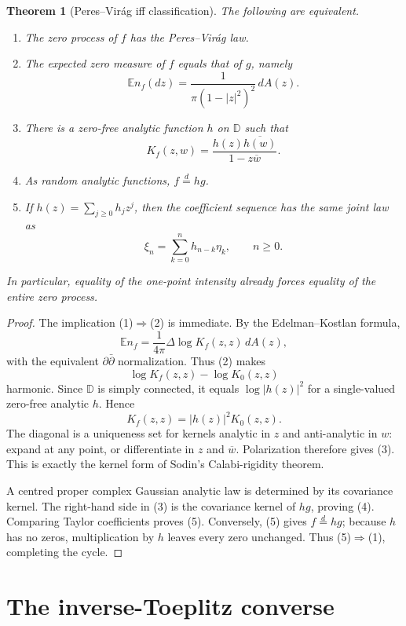 \documentclass[11pt]{article}
\newtheorem{theorem}{Theorem}
\theoremstyle{remark}
\newcommand{\D}{\mathbb D}
\newcommand{\E}{\mathbb E}
\begin{document}
\begin{theorem}[Peres--Vir\'ag iff classification]\label{thm:iff}
The following are equivalent.
\begin{enumerate}
\item The zero process of $f$ has the Peres--Vir\'ag law.
\item The expected zero measure of $f$ equals that of $g$, namely
\[
 \E n_f(dz)=\frac{1}{\pi(1-|z|^2)^2}\,dA(z).
\]
\item There is a zero-free analytic function $h$ on $\D$ such that
\[
 K_f(z,w)=\frac{h(z)\overline{h(w)}}{1-z\overline w}.
\]
\item As random analytic functions, $f\stackrel d=hg$.
\item If $h(z)=\sum_{j\ge0}h_jz^j$, then the coefficient sequence has the
same joint law as
\[
 \xi_n=\sum_{k=0}^{n}h_{n-k}\eta_k,\qquad n\ge0.
\]
\end{enumerate}
In particular, equality of the one-point intensity already forces equality of
the entire zero process.
\end{theorem}

\begin{proof}
The implication (1)$\Rightarrow$(2) is immediate.  By the
Edelman--Kostlan formula,
\[
 \E n_f=\frac{1}{4\pi}\Delta\log K_f(z,z)\,dA(z),
\]
with the equivalent $\partial\bar\partial$ normalization.  Thus (2) makes
\[
 \log K_f(z,z)-\log K_0(z,z)
\]
harmonic.  Since $\D$ is simply connected, it equals $\log|h(z)|^2$ for a
single-valued zero-free analytic $h$.  Hence
\[
 K_f(z,z)=|h(z)|^2K_0(z,z).
\]
The diagonal is a uniqueness set for kernels analytic in $z$ and
anti-analytic in $w$: expand at any point, or differentiate in $z$ and
$\overline w$.  Polarization therefore gives (3).  This is exactly the kernel
form of Sodin's Calabi-rigidity theorem.

A centred proper complex Gaussian analytic law is determined by its covariance
kernel.  The right-hand side in (3) is the covariance kernel of $hg$, proving
(4).  Comparing Taylor coefficients proves (5).  Conversely, (5) gives
$f\stackrel d=hg$; because $h$ has no zeros, multiplication by $h$ leaves every
zero unchanged.  Thus (5)$\Rightarrow$(1), completing the cycle.
\end{proof}

\section{The inverse-Toeplitz converse}
\end{document}
